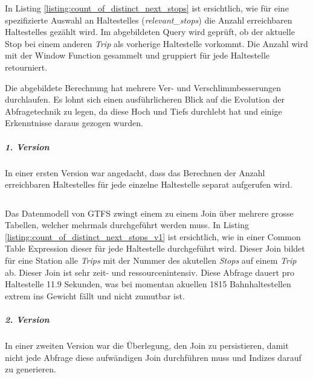 \begin{listing}[ht]
    \inputminted{sql}{projectdoc/listing/count_of_distinct_next_stops.sql}
    \caption{SQL-Query zur Bestimmung der Anzahl erreichbaren \glspl{Haltestelle} (finale Version)}
    \label{listing:count_of_distinct_next_stops}
\end{listing}

In Listing \ref{listing:count_of_distinct_next_stops} ist ersichtlich, wie für eine spezifizierte Auswahl an \glspl{Haltestelle} (\emph{relevant\_stops}) die Anzahl erreichbaren \glspl{Haltestelle} gezählt wird.
Im abgebildeten Query wird geprüft, ob der aktuelle Stop bei einem anderen \emph{Trip} als vorherige \gls{Haltestelle} vorkommt.
Die Anzahl wird mit der Window Function gesammelt und gruppiert für jede \gls{Haltestelle} retourniert.

Die abgebildete Berechnung hat mehrere Ver- und Verschlimmbesserungen durchlaufen.
Es lohnt sich einen ausführlicheren Blick auf die Evolution der Abfragetechnik zu legen, da diese Hoch und Tiefs durchlebt hat und einige Erkenntnisse daraus gezogen wurden.

\subparagraph{1. Version}
In einer ersten Version war angedacht, dass das Berechnen der Anzahl erreichbaren \glspl{Haltestelle} für jede einzelne \gls{Haltestelle} separat aufgerufen wird.

\begin{listing}[ht]
    \inputminted{sql}{projectdoc/listing/count_of_distinct_next_stops_v1.sql}
    \caption{SQL-Query zur Bestimmung der Anzahl erreichbaren \glspl{Haltestelle} (Version 1)}
    \label{listing:count_of_distinct_next_stops_v1}
\end{listing}

Das Datenmodell von GTFS zwingt einem zu einem Join über mehrere grosse Tabellen, welcher mehrmals durchgeführt werden muss.
In Listing \ref{listing:count_of_distinct_next_stops_v1} ist ersichtlich, wie in einer Common Table Expression dieser für jede \gls{Haltestelle} durchgeführt wird.
Dieser Join bildet für eine Station alle \emph{Trips} mit der Nummer des akutellen \emph{Stops} auf einem \emph{Trip} ab.
Dieser Join ist sehr zeit- und ressourcenintensiv.
Diese Abfrage dauert pro \gls{Haltestelle} 11.9 Sekunden, was bei momentan akuellen 1815 Bahnhaltestellen extrem ins Gewicht fällt und nicht zumutbar ist.

\subparagraph{2. Version}
In einer zweiten Version war die Überlegung, den Join zu persistieren, damit nicht jede Abfrage diese aufwändigen Join durchführen muss und Indizes darauf zu generieren.

